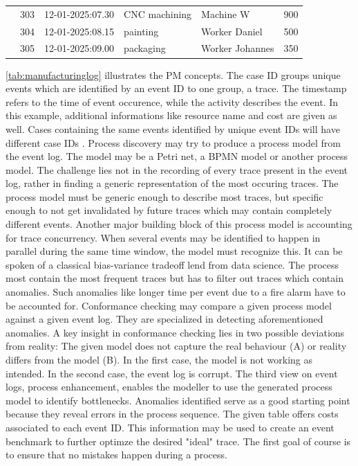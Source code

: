 \begin{table}[htbp]
{\begin{tabular}{r r l l l r}
                       & 303               & 12-01-2025:07.30   & CNC machining         & Machine W          & 900           \\
                       & 304               & 12-01-2025:08.15   & painting              & Worker Daniel      & 500           \\
                       & 305               & 12-01-2025:09.00   & packaging             & Worker Johannes    & 350           \\
      \bottomrule
    \end{tabular}%
  }
\end{table}

\autoref{tab:manufacturinglog} illustrates the PM concepts. The case ID groups unique events which are identified by an event ID to one group, a trace. The timestamp refers to the time of event occurence, while the activity describes the event. In this example, additional informations like resource name and cost are given as well. Cases containing the same events identified by unique event IDs will have different case IDs \autocite{van2016data}. Process discovery may try to produce a process model from the event log. The model may be a Petri net, a BPMN model or another process model. The challenge lies not in the recording of every trace present in the event log, rather in finding a generic representation of the most occuring traces. The process model must be generic enough to describe most traces, but specific enough to not get invalidated by future traces which may contain completely different events. Another major building block of this process model is accounting for trace concurrency. When several events may be identified to happen in parallel during the same time window, the model must recognize this. It can be spoken of a classical bias-variance tradeoff lend from data science. The process most contain the most frequent traces but has to filter out traces which contain anomalies. Such anomalies like longer time per event due to a fire alarm have to be accounted for. Conformance checking may compare a given process model against a given event log. They are specialized in detecting aforementioned anomalies. A key insight in conformance checking lies in two possible deviations from reality: The given model does not capture the real behaviour (A) or reality differs from the model (B). In the first case, the model is not working as intended. In the second case, the event log is corrupt. The third view on event logs, process enhancement, enables the modeller to use the generated process model to identify bottlenecks. Anomalies identified serve as a good starting point because they reveal errors in the process sequence. The given table offers costs associated to each event ID. This information may be used to create an event benchmark to further optimze the desired "ideal" trace. The first goal of course is to ensure that no mistakes happen during a process.

